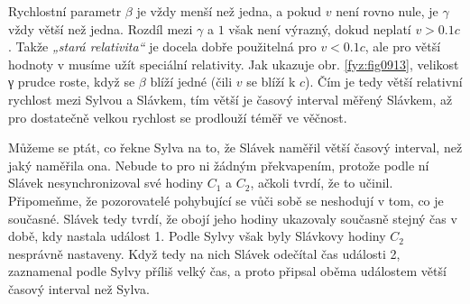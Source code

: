     Rychlostní parametr \(\beta\) je vždy menší než jedna, a pokud \(v\) není rovno nule, je
    \(\gamma\) vždy větší než jedna. Rozdíl mezi \(\gamma\) a \(1\) však není výrazný, dokud neplatí
    \(v > \num{0.1}c\). Takže \emph{„stará relativita“} je docela dobře použitelná pro \(v <
    \num{0.1}c\), ale pro větší hodnoty v musíme užít speciální relativity. Jak ukazuje obr.
    \ref{fyz:fig0913}, velikost γ prudce roste, když se \(\beta\) blíží jedné (čili \(v\) se blíží k
    \(c\)). Čím je tedy větší relativní rychlost mezi Sylvou a Slávkem, tím větší je časový interval
    měřený Slávkem, až pro dostatečně velkou rychlost se prodlouží téměř ve věčnost.

    Můžeme se ptát, co řekne Sylva na to, že Slávek naměřil větší časový interval, než jaký naměřila
    ona. Nebude to pro ni žádným překvapením, protože podle ní Slávek nesynchronizoval své hodiny
    \(C_1\) a \(C_2\), ačkoli tvrdí, že to učinil. Připomeňme, že pozorovatelé pohybující se vůči
    sobě se neshodují v tom, co je současné. Slávek tedy tvrdí, že obojí jeho hodiny ukazovaly
    současně stejný čas v době, kdy nastala událost 1. Podle Sylvy však byly Slávkovy hodiny \(C_2\)
    nesprávně nastaveny. Když tedy na nich Slávek odečítal čas události 2, zaznamenal podle Sylvy
    příliš velký čas, a proto připsal oběma událostem větší časový interval než Sylva.


